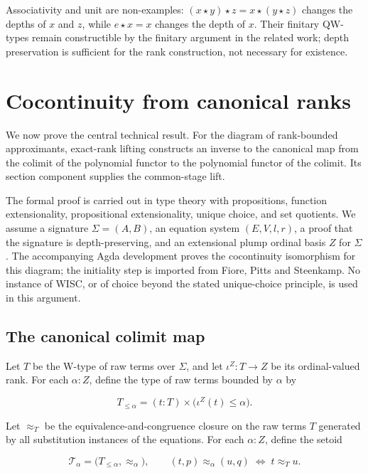 \documentclass[runningheads]{llncs}
\begin{document}
Associativity and unit are non-examples:
\((x\star y)\star z=x\star (y\star z)\) changes the depths of \(x\) and
\(z\), while \(e\star x=x\) changes the depth of \(x\). Their finitary
QW-types remain constructible by the finitary argument in the related
work; depth preservation is
sufficient for the rank construction, not necessary for existence.

\section{Cocontinuity from canonical
ranks}\label{cocontinuity-from-canonical-ranks}

We now prove the central technical result. For the diagram of
rank-bounded approximants, exact-rank lifting constructs an inverse to
the canonical map from the colimit of the polynomial functor to the
polynomial functor of the colimit. Its section component supplies the
common-stage lift.

The formal proof is carried out in type theory
with propositions, function extensionality, propositional
extensionality, unique choice, and set quotients. We assume a signature
\(\Sigma=(A,B)\), an equation system \((E,V,l,r)\), a proof that the
signature is depth-preserving, and an extensional plump ordinal basis
\(Z\) for \(\Sigma\). The accompanying Agda development proves the
cocontinuity isomorphism for this diagram; the initiality step is imported
from Fiore, Pitts and Steenkamp.
No instance of WISC, or of choice beyond the stated unique-choice
principle, is used in this argument.

\subsection{The canonical colimit
map}\label{the-canonical-colimit-map}

Let \(T\) be the W-type of raw terms over \(\Sigma\), and let
\(\iota^Z:T\to Z\) be its ordinal-valued rank. For each \(\alpha:Z\),
define the type of raw terms bounded by \(\alpha\) by

\[
T_{\leq\alpha} = (t:T)\times\bigl(\iota^Z (t)\leq\alpha\bigr).
\]

Let \(\approx_T\) be the equivalence-and-congruence closure on the raw
terms \(T\) generated by all substitution instances of the equations.
For each \(\alpha:Z\), define the setoid

\[
\mathcal{T}_\alpha
  = \bigl(T_{\leq\alpha},\mathrel{\approx_\alpha}\bigr),
\qquad
(t,p)\approx_\alpha(u,q)\;\Longleftrightarrow\;t\approx_T u.
\]
\end{document}

